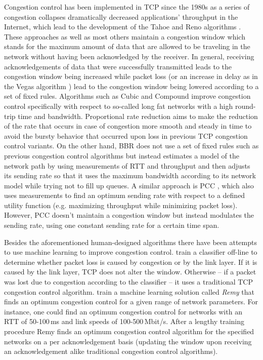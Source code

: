 \documentclass[sigconf]{acmart}
\begin{document}
Congestion control has been implemented in TCP since the 1980s as a series of congestion collapses dramatically decreased applications' throughput in the Internet, which lead to the development of the Tahoe and Reno algorithms \cite{jacobson_congestion_1988}. These approaches as well as most others maintain a congestion window which stands for the maximum amount of data that are allowed to be traveling in the network without having been acknowledged by the receiver. In general, receiving acknowledgements of data that were successfully transmitted leads to the congestion window being increased while packet loss (or an increase in delay as in the Vegas algorithm \cite{brakmo_tcp_1995}) lead to the congestion window being lowered according to a set of fixed rules. Algorithms such as Cubic and Compound \cite{ha_cubic:_2008, tan_compound_2006} improve congestion control specifically with respect to so-called long fat networks with a high round-trip time and bandwidth. Proportional rate reduction \cite{dukkipati_proportional_2011} aims to make the reduction of the rate that occurs in case of congestion more smooth and steady in time to avoid the bursty behavior that occurred upon loss in previous TCP congestion control variants. On the other hand, BBR \cite{cardwell_bbr:_2016} does not use a set of fixed rules such as previous congestion control algorithms but instead estimates a model of the network path by using measurements of RTT and throughput and then adjusts its sending rate so that it uses the maximum bandwidth according to its network model while trying not to fill up queues. A similar approach is PCC \cite{dong_pcc:_2015}, which also uses measurements to find an optimum sending rate with respect to a defined utility function (e.g. maximizing throughput while minimizing packet loss). However, PCC doesn't maintain a congestion window but instead modulates the sending rate, using one constant sending rate for a certain time span.

Besides the aforementioned human-designed algorithms there have been attempts to use machine learning to improve congestion control. \citet{geurts_machine_2004} train a classifier off-line to determine whether packet loss is caused by congestion or by the link layer. If it is caused by the link layer, TCP does not alter the window. Otherwise -- if a packet was lost due to congestion according to the classifier -- it uses a traditional TCP congestion control algorithm. \citet{winstein_tcp_2013} train a machine learning solution called \textit{Remy} that finds an optimum congestion control for a given range of network parameters. For instance, one could find an optimum congestion control for networks with an RTT of 50-100\,ms and link speeds of 100-500\,Mbit/s. After a lengthy training procedure Remy finds an optimum congestion control algorithm for the specified networks on a per acknowledgement basis (updating the window upon receiving an acknowledgement alike traditional congestion control algorithms). 
\end{document}
